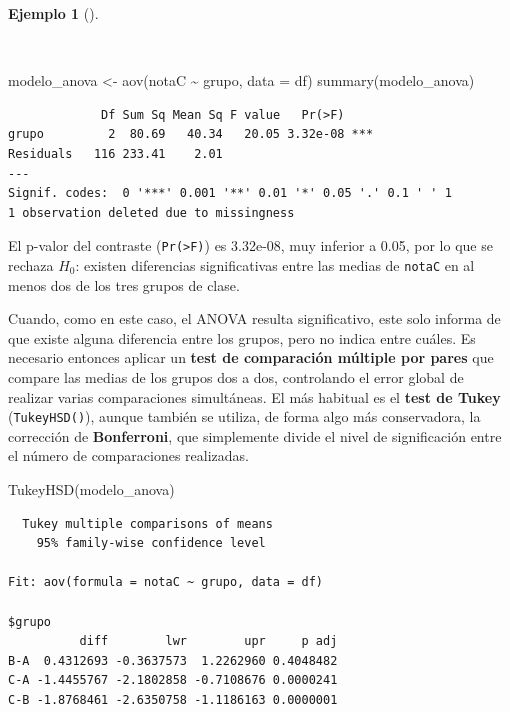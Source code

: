 \documentclass[
  spanish,
  a4paper,
]{scrreport}
\newenvironment{Shaded}{\begin{snugshade}}{\end{snugshade}}
\newcommand{\AttributeTok}[1]{\textcolor[rgb]{0.40,0.45,0.13}{#1}}
\newcommand{\FunctionTok}[1]{\textcolor[rgb]{0.28,0.35,0.67}{#1}}
\newcommand{\NormalTok}[1]{\textcolor[rgb]{0.00,0.23,0.31}{#1}}
\newcommand{\OtherTok}[1]{\textcolor[rgb]{0.00,0.23,0.31}{#1}}
\newcommand{\SpecialCharTok}[1]{\textcolor[rgb]{0.37,0.37,0.37}{#1}}
\theoremstyle{definition}
\newtheorem{example}{Ejemplo}[chapter]
\theoremstyle{definition}
\theoremstyle{remark}
\begin{document}
\begin{example}[]\protect\hypertarget{exm-masdosindep-anova}{}\label{exm-masdosindep-anova}

~

\begin{Shaded}
\begin{Highlighting}[]
\NormalTok{modelo\_anova }\OtherTok{\textless{}{-}} \FunctionTok{aov}\NormalTok{(notaC }\SpecialCharTok{\textasciitilde{}}\NormalTok{ grupo, }\AttributeTok{data =}\NormalTok{ df)}
\FunctionTok{summary}\NormalTok{(modelo\_anova)}
\end{Highlighting}
\end{Shaded}

\begin{verbatim}
             Df Sum Sq Mean Sq F value   Pr(>F)    
grupo         2  80.69   40.34   20.05 3.32e-08 ***
Residuals   116 233.41    2.01                     
---
Signif. codes:  0 '***' 0.001 '**' 0.01 '*' 0.05 '.' 0.1 ' ' 1
1 observation deleted due to missingness
\end{verbatim}

El p-valor del contraste (\texttt{Pr(\textgreater{}F)}) es 3.32e-08, muy
inferior a 0.05, por lo que se rechaza \(H_0\): existen diferencias
significativas entre las medias de \texttt{notaC} en al menos dos de los
tres grupos de clase.

\end{example}

Cuando, como en este caso, el ANOVA resulta significativo, este solo
informa de que existe alguna diferencia entre los grupos, pero no indica
entre cuáles. Es necesario entonces aplicar un \textbf{test de
comparación múltiple por pares} que compare las medias de los grupos dos
a dos, controlando el error global de realizar varias comparaciones
simultáneas. El más habitual es el \textbf{test de Tukey}
(\texttt{TukeyHSD()}), aunque también se utiliza, de forma algo más
conservadora, la corrección de \textbf{Bonferroni}, que simplemente
divide el nivel de significación entre el número de comparaciones
realizadas.

\begin{Shaded}
\begin{Highlighting}[]
\FunctionTok{TukeyHSD}\NormalTok{(modelo\_anova)}
\end{Highlighting}
\end{Shaded}

\begin{verbatim}
  Tukey multiple comparisons of means
    95% family-wise confidence level

Fit: aov(formula = notaC ~ grupo, data = df)

$grupo
          diff        lwr        upr     p adj
B-A  0.4312693 -0.3637573  1.2262960 0.4048482
C-A -1.4455767 -2.1802858 -0.7108676 0.0000241
C-B -1.8768461 -2.6350758 -1.1186163 0.0000001
\end{verbatim}
\end{document}
